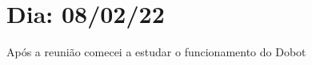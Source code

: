 \chapter{Dia: 08/02/22}
\label{chap:08-02-22}

Após a reunião comecei a estudar o funcionamento do Dobot